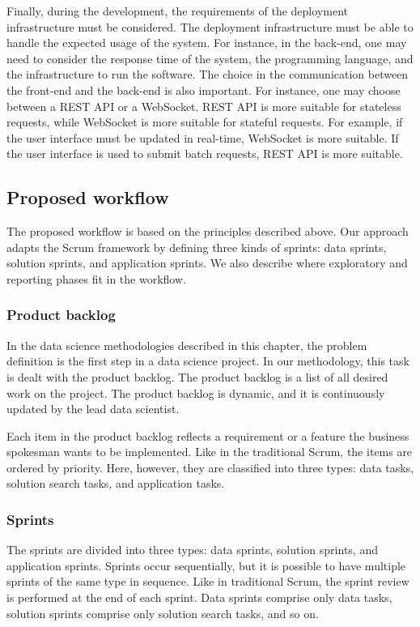 Finally, during the development, the requirements of the deployment infrastructure must be
considered.  The deployment infrastructure must be able to handle the expected usage
of the system.  For instance, in the back-end, one may need to consider the response time
of the system, the programming language, and the infrastructure to run the software.
The choice in the communication between the front-end and the back-end is also important.
For instance, one may choose between a REST API or a WebSocket.  REST API is more suitable
for stateless requests, while WebSocket is more suitable for stateful requests.  For
example, if the user interface must be updated in real-time, WebSocket is more suitable.
If the user interface is used to submit batch requests, REST API is more suitable.

\subsection{Proposed workflow}
\label{sub:workflow}

The proposed workflow is based on the principles described above.  Our approach adapts
the Scrum framework by defining three kinds of sprints: data sprints, solution sprints, and
application sprints.  We also describe where exploratory and reporting phases fit in the
workflow.

\subsubsection{Product backlog}

In the data science methodologies described in this chapter, the problem definition is the first step
in a data science project.  In our methodology, this task is dealt with the product
backlog.  The product backlog is a list of all desired work on the project. The product
backlog is dynamic, and it is continuously updated by the
lead data scientist.

Each item in the product backlog reflects a requirement or a feature the business
spokesman wants to be implemented.  Like in the traditional Scrum, the items are ordered
by priority.  Here, however, they are classified into three types: data tasks, solution
search tasks, and application tasks.

\subsubsection{Sprints}

The sprints are divided into three types: data sprints, solution sprints, and application
sprints.  Sprints occur sequentially, but it is possible to have multiple sprints of the
same type in sequence.  Like in traditional Scrum, the sprint review is performed at the
end of each sprint.  Data sprints comprise only data tasks, solution sprints comprise only
solution search tasks, and so on.

